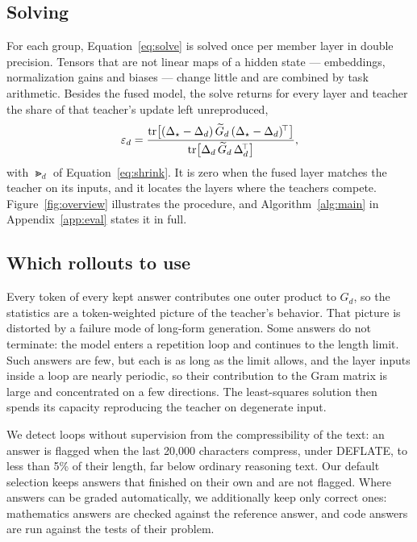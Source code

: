 \subsection{Solving}
\label{sec:solve}

For each group, Equation~\eqref{eq:solve} is solved once per member layer in
double precision. Tensors that are not linear maps of a hidden state ---
embeddings, normalization gains and biases --- change little and are combined
by task arithmetic. Besides the fused model, the solve returns for every layer
and teacher the share of that teacher's update left unreproduced,
\begin{equation}
\varepsilon_d=\frac{\operatorname{tr}\!\big[(\Delta_\star-\Delta_d)\,\widetilde{G}_d\,(\Delta_\star-\Delta_d)^{\!\top}\big]}
{\operatorname{tr}\!\big[\Delta_d\,\widetilde{G}_d\,\Delta_d^{\!\top}\big]},
\label{eq:diag}
\end{equation}
with $\Gt_d$ of Equation~\eqref{eq:shrink}. It is zero when the fused layer
matches the teacher on its inputs, and it locates the layers where the
teachers compete. Figure~\ref{fig:overview} illustrates the procedure, and
Algorithm~\ref{alg:main} in Appendix~\ref{app:eval} states it in full.

\subsection{Which rollouts to use}
\label{sec:selection}

Every token of every kept answer contributes one outer product to $G_d$, so
the statistics are a token-weighted picture of the teacher's behavior. That
picture is distorted by a failure mode of long-form generation. Some answers
do not terminate: the model enters a repetition loop and continues to the
length limit. Such answers are few, but each is as long as the limit allows,
and the layer inputs inside a loop are nearly periodic, so their contribution
to the Gram matrix is large and concentrated on a few directions. The
least-squares solution then spends its capacity reproducing the teacher on
degenerate input.

We detect loops without supervision from the compressibility of the text: an
answer is flagged when the last 20{,}000 characters compress, under DEFLATE, to
less than 5\% of their length, far below ordinary reasoning text. Our default
selection keeps answers that finished on their own and are not flagged. Where
answers can be graded automatically, we additionally keep only correct ones:
mathematics answers are checked against the reference answer, and code
answers are run against the tests of their problem.


